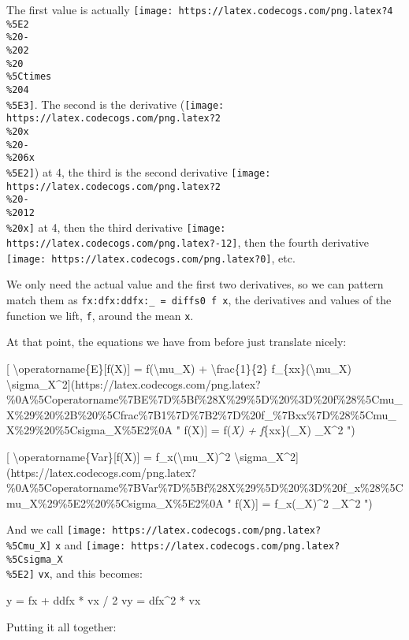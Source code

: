 \documentclass[]{article}
\newenvironment{Shaded}{}{}
\newcommand{\DecValTok}[1]{\textcolor[rgb]{0.25,0.63,0.44}{#1}}
\newcommand{\NormalTok}[1]{#1}
\newcommand{\OperatorTok}[1]{\textcolor[rgb]{0.40,0.40,0.40}{#1}}
\newcommand{\OtherTok}[1]{\textcolor[rgb]{0.00,0.44,0.13}{#1}}
\begin{document}
The first value is actually
\texttt{[image: https://latex.codecogs.com/png.latex?4\\\%5E2\\\%20-\\\%202\\\%20\\\%5Ctimes\\\%204\\\%5E3]}.
The second is the derivative
(\texttt{[image: https://latex.codecogs.com/png.latex?2\\\%20x\\\%20-\\\%206x\\\%5E2]})
at 4, the third is the second derivative
\texttt{[image: https://latex.codecogs.com/png.latex?2\\\%20-\\\%2012\\\%20x]} at 4,
then the third derivative
\texttt{[image: https://latex.codecogs.com/png.latex?-12]}, then the fourth
derivative \texttt{[image: https://latex.codecogs.com/png.latex?0]}, etc.

We only need the actual value and the first two derivatives, so we can pattern
match them as \texttt{fx:dfx:ddfx:\_\ =\ diffs0\ f\ x}, the derivatives and
values of the function we lift, \texttt{f}, around the mean \texttt{x}.

At that point, the equations we have from before just translate nicely:

{[} \textbackslash operatorname\{E\}{[}f(X){]} = f(\textbackslash mu\_X) +
\textbackslash frac\{1\}\{2\} f\_\{xx\}(\textbackslash mu\_X)
\textbackslash sigma\_X\^{}2{]}(https://latex.codecogs.com/png.latex?\%0A\%5Coperatorname\%7BE\%7D\%5Bf\%28X\%29\%5D\%20\%3D\%20f\%28\%5Cmu\_X\%29\%20\%2B\%20\%5Cfrac\%7B1\%7D\%7B2\%7D\%20f\_\%7Bxx\%7D\%28\%5Cmu\_X\%29\%20\%5Csigma\_X\%5E2\%0A
" \operatorname{E}{[}f(X){]} = f(\mu\emph{X) +  f}\{xx\}(\mu\_X)
\sigma\_X\^{}2 ")

{[} \textbackslash operatorname\{Var\}{[}f(X){]} =
f\_x(\textbackslash mu\_X)\^{}2
\textbackslash sigma\_X\^{}2{]}(https://latex.codecogs.com/png.latex?\%0A\%5Coperatorname\%7BVar\%7D\%5Bf\%28X\%29\%5D\%20\%3D\%20f\_x\%28\%5Cmu\_X\%29\%5E2\%20\%5Csigma\_X\%5E2\%0A
" \operatorname{Var}{[}f(X){]} = f\_x(\mu\_X)\^{}2 \sigma\_X\^{}2 ")

And we call \texttt{[image: https://latex.codecogs.com/png.latex?\\\%5Cmu\_X]}
\texttt{x} and
\texttt{[image: https://latex.codecogs.com/png.latex?\\\%5Csigma\_X\\\%5E2]}
\texttt{vx}, and this becomes:

\begin{Shaded}
\begin{Highlighting}[]
\NormalTok{y  }\OtherTok{=}\NormalTok{ fx }\OperatorTok{+}\NormalTok{ ddfx }\OperatorTok{*}\NormalTok{ vx }\OperatorTok{/} \DecValTok{2}
\NormalTok{vy }\OtherTok{=}\NormalTok{ dfx}\OperatorTok{\^{}}\DecValTok{2} \OperatorTok{*}\NormalTok{ vx}
\end{Highlighting}
\end{Shaded}

Putting it all together:
\end{document}
